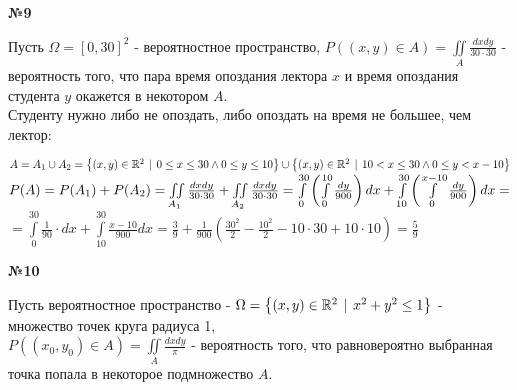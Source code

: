 \documentclass{article}
\newenvironment{task}{\begin{center}\fontsize{14}{14}\selectfont\bf}{\rm\fontsize{12}{12}\selectfont\end{center}}
\begin{document}
	\begin{task} 
		№9
	\end{task}
	Пусть $\Omega = [0, 30]^2$ - вероятностное пространство, $P((x, y) \in A) = \iint\limits_A\frac{dxdy}{30\cdot30}$ - вероятность того, что пара время опоздания лектора $x$ и время опоздания студента $y$ окажется в некотором $A$.\\
	Студенту нужно либо не опоздать, либо опоздать на время не большее, чем лектор: 
	\begin{center}
		$A = A_1 \cup A_2 = \left\lbrace(x, y) \in \mathbb{R}^2 \hspace{4px}|\hspace{4px} 0 \leq x \leq 30 \wedge 0\leq y \leq 10 \right\rbrace \cup \left\lbrace(x, y) \in \mathbb{R}^2 \hspace{4px}|\hspace{4px} 10 < x \leq 30 \wedge 0 \leq y < x - 10 \right\rbrace$ \\
		$P(A) = P(A_1) + P(A_2) = \iint\limits_{A_1}\frac{dxdy}{30\cdot30} + \iint\limits_{A_2}\frac{dxdy}{30\cdot30} 
		= \int\limits\limits_0^{30} \left( \int\limits_0^{10} \frac{dy}{900} \right)dx + \int\limits_{10}^{30} \left( \int\limits_0^{x-10} \frac{dy}{900} \right)dx = $\\$ 
		= \int\limits_0^{30} \frac{1}{90}\cdot dx + \int\limits_{10}^{30}  \frac{x-10}{900}dx
		= \frac{3}{9} + \frac{1}{900}\left(\frac{30^2}{2} - \frac{10^2}{2} - 10\cdot30 + 10\cdot 10 \right) = \frac{5}{9}$
		
	\end{center}



	\begin{task} 
		№10
	\end{task}
	Пусть вероятностное пространство - $\Omega = \left\lbrace(x, y) \in \mathbb{R}^2 \hspace{4px}|\hspace{4px} x^2 + y^2 \leq 1 \right\rbrace$ - множество точек круга радиуса 1,\\ $P((x_0, y_0) \in A) = \iint\limits_{A}\frac{dxdy}{\pi}$ - вероятность того, что равновероятно выбранная точка попала в некоторое подмножество $A$. \\
	
\end{document}
